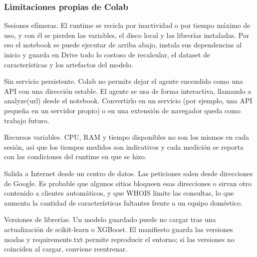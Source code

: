 \subsubsection{Limitaciones propias de Colab}

Sesiones efímeras. El runtime se recicla por inactividad o por tiempo máximo de uso, y con él se pierden las variables, el disco local y las librerías instaladas. Por eso el notebook se puede ejecutar de arriba abajo, instala sus dependencias al inicio y guarda en Drive todo lo costoso de recalcular, el dataset de características y los artefactos del modelo. \newline

Sin servicio persistente. Colab no permite dejar el agente encendido como una API con una dirección estable. El agente se usa de forma interactiva, llamando a analyze(url) desde el notebook. Convertirlo en un servicio (por ejemplo, una API pequeña en un servidor propio) o en una extensión de navegador queda como trabajo futuro. \newline

Recursos variables. CPU, RAM y tiempo disponibles no son los mismos en cada sesión, así que los tiempos medidos son indicativos y cada medición se reporta con las condiciones del runtime en que se hizo. \newline

Salida a Internet desde un centro de datos. Las peticiones salen desde direcciones de Google. Es probable que algunos sitios bloqueen esas direcciones o sirvan otro contenido a clientes automáticos, y que WHOIS limite las consultas, lo que aumenta la cantidad de características faltantes frente a un equipo doméstico. \newline

Versiones de librerías. Un modelo guardado puede no cargar tras una actualización de scikit-learn o XGBoost. El manifiesto guarda las versiones usadas y requirements.txt permite reproducir el entorno; si las versiones no coinciden al cargar, conviene reentrenar. \newline
